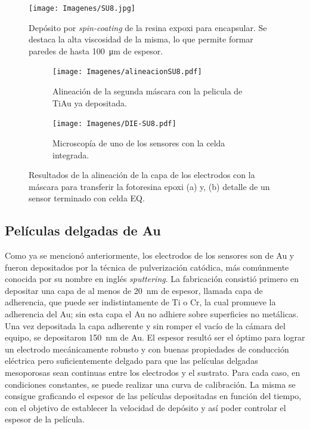 			  	\begin{figure}[th!]
 				\centering
 				\texttt{[image: Imagenes/SU8.jpg]}
 				\caption[Depósito de la resina epoxi SU8]{Depósito por \textit{spin-coating }de la resina expoxi para encapsular. Se destaca la alta viscosidad de la misma, lo que permite formar paredes de hasta \SI{100}{\um} de espesor.}
 				\label{fig:su8}
 				\vspace*{6mm}
 				\end{figure}
 		
 				\begin{figure}[h!]
			 	   	    \centering
			 	   	    \begin{subfigure}[t]{0.495\textwidth}
			        	\texttt{[image: Imagenes/alineacionSU8.pdf]}
			       		\caption{Alineación de la segunda máscara con la pelicula de Ti\textbar Au ya depositada.}
			         	\label{fig:alineacion}
			     		\end{subfigure}
			     		\begin{subfigure}[t]{0.495\textwidth}
			     		\texttt{[image: Imagenes/DIE-SU8.pdf]}
			    		\caption{Microscopía de uno de los sensores con la celda integrada.}
			     		\label{fig:die-su8}	
						\end{subfigure}
						\caption[Alineación y celda integrada en SU8]{Resultados de la alineación de la capa de los electrodos con la máscara para transferir la fotoresina epoxi (a) y, (b) detalle de un sensor terminado con celda EQ.}
			     		\label{fig:resultados-su8}
			     	   	\end{figure}

	\subsection{Películas delgadas de Au}

		 Como ya se mencionó anteriormente, los electrodos de los sensores son de Au y fueron depositados por la técnica de pulverización catódica, más comúnmente conocida por su nombre en inglés \textit{sputtering}. La fabricación consistió primero en depositar una capa de al menos de \SI{20}{\nm} de espesor, llamada capa de  adherencia, que puede ser indistintamente de Ti o Cr, la cual promueve la adherencia del Au; sin esta capa el Au no adhiere sobre superficies no metálicas.\cite{Hieber1976} Una vez depositada la capa adherente y sin romper el vacío de la cámara del equipo, se depositaron \SI{150}{nm} de Au. El espesor resultó ser el óptimo para lograr un electrodo mecánicamente robusto y con buenas propiedades de conducción eléctrica pero suficientemente delgado para que las películas delgadas mesoporosas sean continuas entre los electrodos y el sustrato. Para cada caso, en condiciones constantes, se puede realizar una curva de calibración. La misma se consigue graficando el espesor de las películas depositadas en función del tiempo, con el objetivo de establecer la velocidad de depósito y así poder controlar el espesor de la película. 

